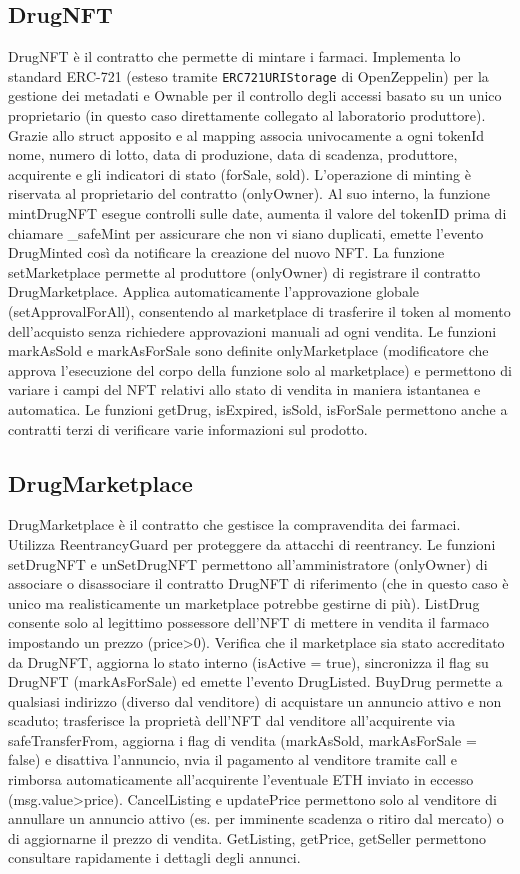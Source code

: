 \documentclass[12pt,a4paper]{article}
\begin{document}
\subsection{DrugNFT}
DrugNFT è il contratto che permette di mintare i farmaci.
Implementa lo standard ERC-721 (esteso tramite \texttt{ERC721URIStorage} di OpenZeppelin) per la gestione dei metadati e Ownable per il controllo degli accessi basato su un unico proprietario (in questo caso direttamente collegato al laboratorio
produttore). Grazie allo struct apposito e al mapping associa univocamente a ogni tokenId nome, numero di lotto, data di produzione, data di scadenza, produttore, acquirente e gli indicatori di stato (forSale, sold).
L'operazione di minting è riservata al proprietario del contratto (onlyOwner). Al suo interno, la funzione mintDrugNFT esegue controlli sulle date, 
aumenta il valore del tokenID prima di chiamare _safeMint per assicurare che non vi siano duplicati, emette l'evento DrugMinted così da notificare la creazione del nuovo NFT.
La funzione setMarketplace permette al produttore (onlyOwner) di registrare il contratto DrugMarketplace. Applica automaticamente l'approvazione globale (setApprovalForAll), consentendo al marketplace di trasferire il token al momento dell'acquisto senza richiedere approvazioni manuali ad ogni vendita.
Le funzioni markAsSold e markAsForSale sono definite onlyMarketplace (modificatore che approva l'esecuzione del corpo della funzione solo al marketplace) 
e permettono di variare i campi del NFT relativi allo stato di vendita in maniera istantanea e automatica.
Le funzioni getDrug, isExpired, isSold, isForSale permettono anche a contratti terzi di verificare varie informazioni sul prodotto.

\subsection{DrugMarketplace}
DrugMarketplace è il contratto che gestisce la compravendita dei farmaci.
Utilizza ReentrancyGuard per proteggere da attacchi di reentrancy.
Le funzioni setDrugNFT e unSetDrugNFT permettono all'amministratore (onlyOwner) di associare o disassociare il contratto DrugNFT di riferimento (che in questo caso
è unico ma realisticamente un marketplace potrebbe gestirne di più).
ListDrug consente solo al legittimo possessore dell'NFT di mettere in vendita il farmaco impostando un prezzo (price>0).
Verifica che il marketplace sia stato accreditato da DrugNFT, aggiorna lo stato interno (isActive = true), sincronizza il flag su DrugNFT (markAsForSale) ed emette l'evento DrugListed.
BuyDrug permette a qualsiasi indirizzo (diverso dal venditore) di acquistare un annuncio attivo e non scaduto;
trasferisce la proprietà dell'NFT dal venditore all'acquirente via safeTransferFrom, aggiorna i flag di vendita (markAsSold, markAsForSale = false) e disattiva l'annuncio,
nvia il pagamento al venditore tramite call e rimborsa automaticamente all'acquirente l'eventuale ETH inviato in eccesso (msg.value>price).
CancelListing e updatePrice permettono solo al venditore di annullare un annuncio attivo (es. per imminente scadenza o ritiro dal mercato) o di aggiornarne il prezzo di vendita.
GetListing, getPrice, getSeller permettono consultare rapidamente i dettagli degli annunci.
\end{document}
